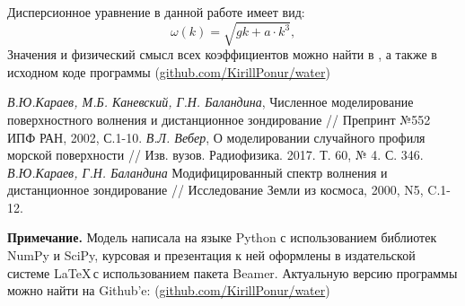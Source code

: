 Дисперсионное уравнение в данной работе имеет вид:
\begin{equation}
	\label{eq:w_k}
	\omega(k)=\sqrt{gk+a\cdot k^3},
\end{equation}
Значения и физический смысл всех коэффициентов можно найти в \cite{Karaev1}, а также в исходном коде программы 
(\href{https://github.com/KirillPonur/water}{github.com/KirillPonur/water})

\newpage
\begin{thebibliography}{}
	 \textit{В.Ю.Караев, М.Б. Каневский, Г.Н. Баландина}, Численное моделирование поверхностного волнения и дистанционное зондирование // Препринт №552 ИПФ РАН, 2002, С.1-10.
	 \textit{В.Л. Вебер}, О моделировании случайного профиля морской поверхности // Изв. вузов. Радиофизика. 2017. Т. 60, № 4. С. 346.
	 \textit{В.Ю.Караев, Г.Н. Баландина} Модифицированный спектр волнения и дистанционное зондирование // Исследование Земли из космоса, 2000, N5, C.1-12.
\end{thebibliography}
\textbf{Примечание.} Модель написала на языке Python с использованием библиотек NumPy и SciPy, курсовая и презентация к ней оформлены в издательской системе \LaTeX\,с использованием пакета Beamer. Актуальную версию программы можно найти на 
Github'e: (\href{https://github.com/KirillPonur/water}{github.com/KirillPonur/water})
